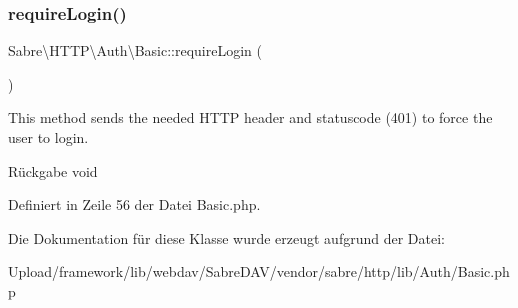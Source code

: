 \subsubsection{\texorpdfstring{require\+Login()}{requireLogin()}}
{\footnotesize\ttfamily Sabre\textbackslash{}\+H\+T\+T\+P\textbackslash{}\+Auth\textbackslash{}\+Basic\+::require\+Login (\begin{DoxyParamCaption}{ }\end{DoxyParamCaption})}

This method sends the needed H\+T\+TP header and statuscode (401) to force the user to login.

\begin{DoxyReturn}{Rückgabe}
void 
\end{DoxyReturn}


Definiert in Zeile 56 der Datei Basic.\+php.



Die Dokumentation für diese Klasse wurde erzeugt aufgrund der Datei\+:\begin{DoxyCompactItemize}
\item 
Upload/framework/lib/webdav/\+Sabre\+D\+A\+V/vendor/sabre/http/lib/\+Auth/Basic.\+php\end{DoxyCompactItemize}
